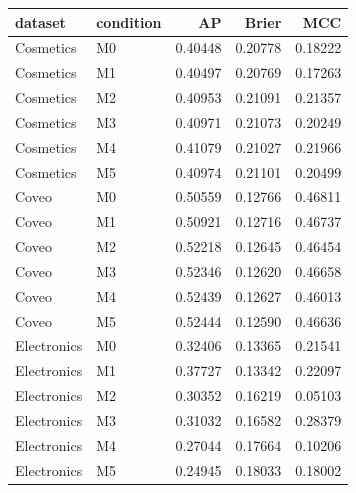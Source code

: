 \begin{tabular}{llrrr}
\toprule
dataset & condition & AP & Brier & MCC \\
\midrule
Cosmetics & M0 & 0.40448 & 0.20778 & 0.18222 \\
Cosmetics & M1 & 0.40497 & 0.20769 & 0.17263 \\
Cosmetics & M2 & 0.40953 & 0.21091 & 0.21357 \\
Cosmetics & M3 & 0.40971 & 0.21073 & 0.20249 \\
Cosmetics & M4 & 0.41079 & 0.21027 & 0.21966 \\
Cosmetics & M5 & 0.40974 & 0.21101 & 0.20499 \\
Coveo & M0 & 0.50559 & 0.12766 & 0.46811 \\
Coveo & M1 & 0.50921 & 0.12716 & 0.46737 \\
Coveo & M2 & 0.52218 & 0.12645 & 0.46454 \\
Coveo & M3 & 0.52346 & 0.12620 & 0.46658 \\
Coveo & M4 & 0.52439 & 0.12627 & 0.46013 \\
Coveo & M5 & 0.52444 & 0.12590 & 0.46636 \\
Electronics & M0 & 0.32406 & 0.13365 & 0.21541 \\
Electronics & M1 & 0.37727 & 0.13342 & 0.22097 \\
Electronics & M2 & 0.30352 & 0.16219 & 0.05103 \\
Electronics & M3 & 0.31032 & 0.16582 & 0.28379 \\
Electronics & M4 & 0.27044 & 0.17664 & 0.10206 \\
Electronics & M5 & 0.24945 & 0.18033 & 0.18002 \\
\bottomrule
\end{tabular}

